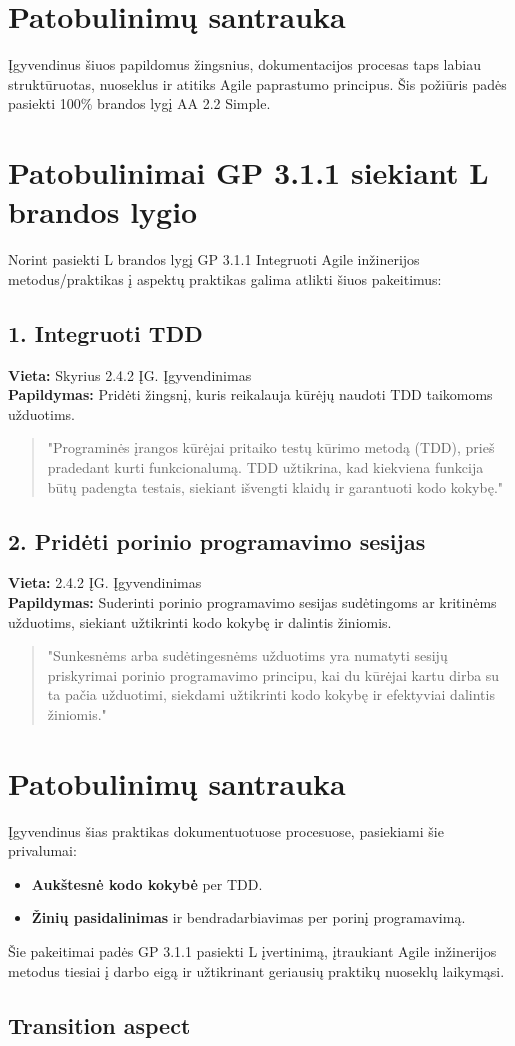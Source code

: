 \documentclass{article}
\begin{document}
\section*{Patobulinimų santrauka}
Įgyvendinus šiuos papildomus žingsnius, dokumentacijos procesas taps labiau struktūruotas, nuoseklus ir atitiks Agile paprastumo principus. Šis požiūris padės pasiekti 100\% brandos lygį AA 2.2 Simple.

\section*{Patobulinimai GP 3.1.1 siekiant L brandos lygio}

Norint pasiekti L brandos lygį GP 3.1.1 Integruoti Agile inžinerijos metodus/praktikas į aspektų praktikas galima atlikti šiuos pakeitimus:

\subsection*{1. Integruoti TDD}
\textbf{Vieta:} Skyrius 2.4.2 ĮG. Įgyvendinimas \\
\textbf{Papildymas:} Pridėti žingsnį, kuris reikalauja kūrėjų naudoti TDD taikomoms užduotims.
\begin{quote}
"Programinės įrangos kūrėjai pritaiko testų kūrimo metodą (TDD), prieš pradedant kurti funkcionalumą. TDD užtikrina, kad kiekviena funkcija būtų padengta testais, siekiant išvengti klaidų ir garantuoti kodo kokybę."
\end{quote}

\subsection*{2. Pridėti porinio programavimo sesijas}
\textbf{Vieta:}  2.4.2 ĮG. Įgyvendinimas \\
\textbf{Papildymas:} Suderinti porinio programavimo sesijas sudėtingoms ar kritinėms užduotims, siekiant užtikrinti kodo kokybę ir dalintis žiniomis.
\begin{quote}
"Sunkesnėms arba sudėtingesnėms užduotims yra numatyti sesijų priskyrimai porinio programavimo principu, kai du kūrėjai kartu dirba su ta pačia užduotimi, siekdami užtikrinti kodo kokybę ir efektyviai dalintis žiniomis."
\end{quote}

\section*{Patobulinimų santrauka}
Įgyvendinus šias praktikas dokumentuotuose procesuose, pasiekiami šie privalumai:
\begin{itemize}
    \item \textbf{Aukštesnė kodo kokybė} per TDD.
    \item \textbf{Žinių pasidalinimas} ir bendradarbiavimas per porinį programavimą.
\end{itemize}

Šie pakeitimai padės GP 3.1.1 pasiekti L įvertinimą, įtraukiant Agile inžinerijos metodus tiesiai į darbo eigą ir užtikrinant geriausių praktikų nuoseklų laikymąsi.

\subsection{Transition aspect}
\end{document}
